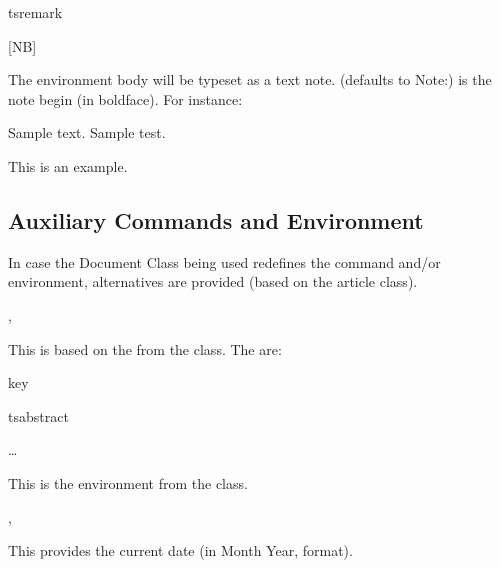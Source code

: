 \documentclass{article}
\begin{document}
\begin{codedescribe}[env]{tsremark}
\begin{codesyntax}
\tsmacro{\begin{tsremark}}[NB]{}
\tsmacro{\end{tsremark}}{}
\end{codesyntax}
 The environment body will be typeset as a text note.  (defaults to Note:) is the note begin (in boldface). For instance:
 \begin{codestore}
 Sample text. Sample test.
  \begin{tsremark}[N.B.]
    This is an example.
  \end{tsremark}
 \end{codestore}
\end{codedescribe}

\subsection{Auxiliary Commands and Environment}
In case the Document Class being used redefines the \tsobj[code]{\maketitle} command and/or  environment, alternatives are provided (based on the article class).

\begin{codedescribe}[code]{\typesettitle,\tstitle}
\begin{codesyntax}
\end{codesyntax}
This is based on the \tsobj[code]{\maketitle} from the  class. The  are:
\end{codedescribe}

\begin{describelist*}{key}
\end{describelist*}

\begin{codedescribe}[env]{tsabstract}
\begin{codesyntax}
\tsmacro{\begin{tsabstract}}{}
\ldots
\tsmacro{\end{tsabstract}}{}
\end{codesyntax}
This is the  environment from the  class.
\end{codedescribe}

\begin{codedescribe}[code,new=2023/05/16]{\typesetdate,\tsdate}
\begin{codesyntax}
\tsmacro{\typesetdate}{}
\tsmacro{\tsdate}{}
\end{codesyntax}
This provides the current date (in Month Year, format).
\end{codedescribe}

\printbibliography
\end{document}
